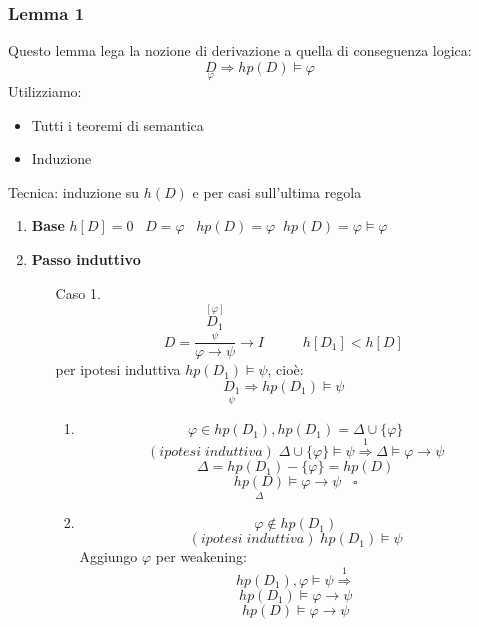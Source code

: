 \documentclass{article}
\theoremstyle{break}
\theoremstyle{break}
\theoremstyle{break}
\theoremstyle{break}
\begin{document}
\subsubsection{Lemma 1}
Questo lemma lega la nozione di derivazione a quella di conseguenza logica:
\[
    \underset{\varphi}{D} \Rightarrow hp(D) \models \varphi
\] 
Utilizziamo:
\begin{itemize}
    \item Tutti i teoremi di semantica
    \item Induzione
\end{itemize}
Tecnica: induzione su \( h(D) \) e per casi sull'ultima regola
\begin{enumerate}
    \item \textbf{Base} \( h[D]=0 \;\;\;D = \varphi \;\;\; hp(D) =\varphi \;\; hp(D)=\varphi \models \varphi \) 
    \item \textbf{Passo induttivo}
        \begin{enumerate}
            \item [Caso 1.]
            \[
                D = \frac{\stackrel{[\varphi]}{\underset{\psi}{D_1}}}{\varphi \to \psi} \to I \;\;\;
                \;\;\;\;\;\;\; h[D_1] < h[D]
            \]
            per ipotesi induttiva \( hp(D_1) \models \psi \), cioè:
            \[
                \underset{\psi}{D_1} \Rightarrow hp(D_1) \models \psi
            \] 
            \begin{enumerate}
                \item \[ \varphi \in  hp(D_1), hp(D_1) = \Delta \cup \{\varphi\}  \] 
                    \[
                        (ipotesi\;induttiva)\; \Delta \cup \{\varphi\} \models \psi \stackrel{1}{\Rightarrow} \Delta \models \varphi \to \psi 
                    \] 
                    \[
                    \Delta = hp(D_1) - \{\varphi\} = hp(D)
                    \] 
                    \[
                        \underset{\Delta}{hp(D)} \models \varphi \to \psi\;\;\; \square
                    \] 
                \item  \[
                \varphi \not\in hp(D_1)
                \]  
                \[
                    (ipotesi\;induttiva)\; hp(D_1) \models \psi
                \] 
                Aggiungo \( \varphi \) per weakening:
                \[
                    hp(D_1),\varphi \models \psi \stackrel{1}{\Rightarrow}
                \] 
                \[ 
                hp(D_1) \models \varphi \to \psi
                \] 
                \[
                hp(D) \models \varphi \to \psi
                \] 

\end{enumerate}
\end{enumerate}
\end{enumerate}
\end{document}
